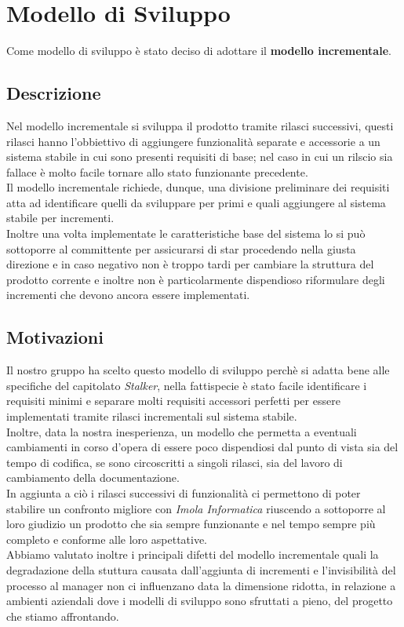 \section{Modello di Sviluppo}
Come modello di sviluppo è stato deciso di adottare il \textbf{modello incrementale}.
\subsection{Descrizione}
Nel modello incrementale si sviluppa il prodotto tramite rilasci successivi, questi rilasci hanno l'obbiettivo di aggiungere funzionalità separate e accessorie 
a un sistema stabile in cui sono presenti requisiti di base; nel caso in cui un rilscio sia fallace è molto facile tornare allo stato funzionante precedente.\\
Il modello incrementale richiede, dunque, una divisione preliminare dei requisiti atta ad identificare quelli da sviluppare per primi e quali aggiungere al sistema 
stabile per incrementi. \\
Inoltre una volta implementate le caratteristiche base del sistema lo si può sottoporre al committente per assicurarsi di star procedendo nella giusta direzione e in caso negativo
non è troppo tardi per cambiare la struttura del prodotto corrente e inoltre non è particolarmente dispendioso riformulare degli incrementi che devono ancora essere implementati. 

\subsection{Motivazioni}
Il nostro gruppo ha scelto questo modello di sviluppo perchè si adatta bene alle specifiche del capitolato \textit{Stalker},
nella fattispecie  è stato facile identificare i requisiti minimi e separare molti requisiti accessori perfetti per essere implementati
tramite rilasci incrementali sul sistema stabile.\\
Inoltre, data la nostra inesperienza, un modello che permetta a eventuali cambiamenti in corso d'opera di essere poco dispendiosi dal punto di vista
sia del tempo di codifica, se sono circoscritti a singoli rilasci, sia del lavoro di cambiamento della documentazione. \\
In aggiunta a ciò i rilasci successivi di funzionalità ci permettono di poter stabilire un confronto migliore con \textit{Imola Informatica}
riuscendo a sottoporre al loro giudizio un prodotto che sia sempre funzionante e nel tempo sempre più completo e conforme alle loro aspettative. \\
Abbiamo valutato inoltre i principali difetti del modello incrementale quali la degradazione della stuttura causata dall'aggiunta di 
incrementi e l'invisibilità del processo al manager non ci influenzano data la dimensione ridotta, in relazione a 
ambienti aziendali dove i modelli di sviluppo sono sfruttati a pieno, del progetto che stiamo affrontando.
 
